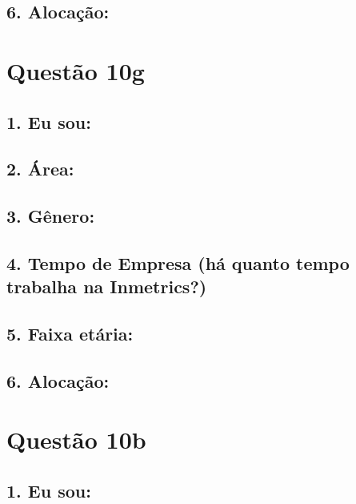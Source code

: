 \documentclass[]{book}
\begin{document}
\hypertarget{alocacao-7}{%
\subsection{6. Alocação:}\label{alocacao-7}}

\hypertarget{questao-10g}{%
\section{Questão 10g}\label{questao-10g}}

\hypertarget{eu-sou-8}{%
\subsection{1. Eu sou:}\label{eu-sou-8}}

\hypertarget{area-8}{%
\subsection{2. Área:}\label{area-8}}

\hypertarget{genero-8}{%
\subsection{3. Gênero:}\label{genero-8}}

\hypertarget{tempo-de-empresa-ha-quanto-tempo-trabalha-na-inmetrics-8}{%
\subsection{4. Tempo de Empresa (há quanto tempo trabalha na Inmetrics?)}\label{tempo-de-empresa-ha-quanto-tempo-trabalha-na-inmetrics-8}}

\hypertarget{faixa-etaria-8}{%
\subsection{5. Faixa etária:}\label{faixa-etaria-8}}

\hypertarget{alocacao-8}{%
\subsection{6. Alocação:}\label{alocacao-8}}

\hypertarget{questao-10b}{%
\section{Questão 10b}\label{questao-10b}}

\hypertarget{eu-sou-9}{%
\subsection{1. Eu sou:}\label{eu-sou-9}}
\end{document}
